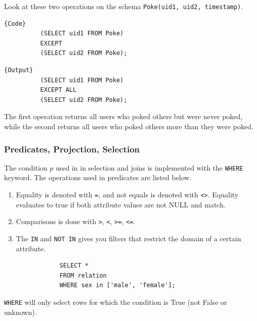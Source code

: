 \documentclass{article}
\begin{document}
      \begin{example}
        Look at these two operations on the schema \texttt{Poke(uid1, uid2, timestamp)}. 

        \noindent\begin{minipage}{.5\textwidth}
        \begin{lstlisting}[]{Code}
          (SELECT uid1 FROM Poke) 
          EXCEPT 
          (SELECT uid2 FROM Poke); 
        \end{lstlisting}
        \end{minipage}
        \hfill
        \begin{minipage}{.49\textwidth}
        \begin{lstlisting}[]{Output}
          (SELECT uid1 FROM Poke) 
          EXCEPT ALL
          (SELECT uid2 FROM Poke); 
        \end{lstlisting}
        \end{minipage}
        The first operation returns all users who poked others but were never poked, while the second returns all users who poked others more than they were poked. 
      \end{example}

    \subsubsection{Predicates, Projection, Selection}

      \begin{definition}
        The condition $p$ used in in selection and joins is implemented with the \texttt{WHERE} keyword. The operations used in predicates are listed below. 
        \begin{enumerate}
          \item Equality is denoted with \texttt{=}, and not equals is denoted with \texttt{<>}. Equality evaluates to true if both attribute values are not NULL and match.  
          \item Comparisons is done with \texttt{>}, \texttt{<}, \texttt{>=}, \texttt{<=}. 
          \item The \texttt{IN} and \texttt{NOT IN} gives you filters that restrict the domain of a certain attribute. 
          \begin{lstlisting}
            SELECT * 
            FROM relation 
            WHERE sex in ['male', 'female']; 
          \end{lstlisting}
        \end{enumerate} 
        \texttt{WHERE} will only select rows for which the condition is True (not False or unknown). 
      \end{definition}
\end{document}
